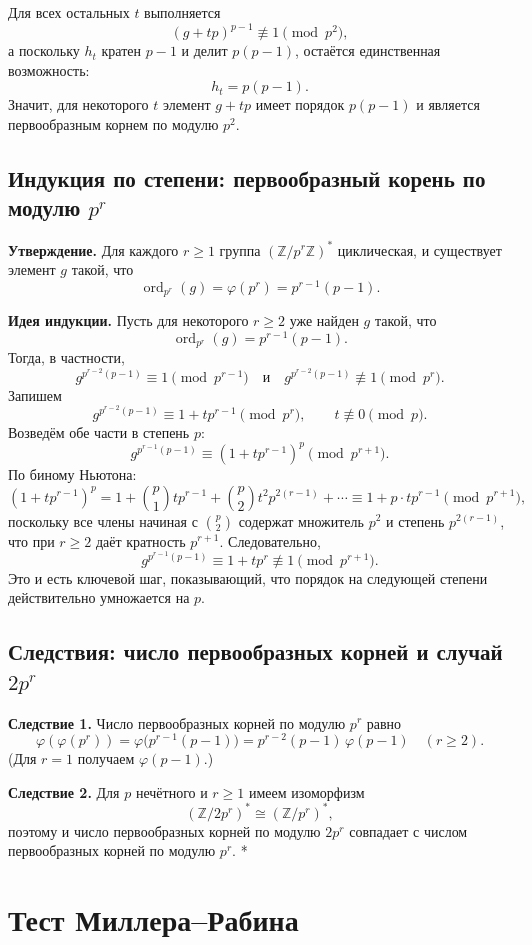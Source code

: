 \documentclass[12pt,a4paper]{article}
\newcommand{\Z}{\mathbb{Z}}
\DeclareMathOperator{\ord}{ord}
\begin{document}
Для всех остальных $t$ выполняется
\[
(g+t p)^{p-1}\not\equiv 1\pmod{p^2},
\]
а поскольку $h_t$ кратен $p-1$ и делит $p(p-1)$, остаётся единственная возможность:
\[
h_t=p(p-1).
\]
Значит, для некоторого $t$ элемент $g+t p$ имеет порядок $p(p-1)$ и является первообразным корнем по модулю $p^2$.

\subsection*{Индукция по степени: первообразный корень по модулю $p^r$}

\textbf{Утверждение.} Для каждого $r\ge 1$ группа $(\Z/p^r\Z)^{\ast}$ циклическая, и существует элемент $g$ такой, что
\[
\ord_{p^r}(g)=\varphi(p^r)=p^{r-1}(p-1).
\]

\textbf{Идея индукции.}
Пусть для некоторого $r\ge 2$ уже найден $g$ такой, что
\[
\ord_{p^r}(g)=p^{r-1}(p-1).
\]
Тогда, в частности,
\[
g^{p^{r-2}(p-1)}\equiv 1\pmod{p^{r-1}}
\quad\text{и}\quad
g^{p^{r-2}(p-1)}\not\equiv 1\pmod{p^{r}}.
\]
Запишем
\[
g^{p^{r-2}(p-1)} \equiv 1+t p^{r-1}\pmod{p^{r}},
\qquad t\not\equiv 0\pmod p.
\]
Возведём обе части в степень $p$:
\[
g^{p^{r-1}(p-1)} \equiv (1+t p^{r-1})^{p}\pmod{p^{r+1}}.
\]
По биному Ньютона:
\[
(1+t p^{r-1})^{p}
=1+\binom{p}{1}t p^{r-1}+\binom{p}{2}t^2 p^{2(r-1)}+\cdots
\equiv 1+p\cdot t p^{r-1}\pmod{p^{r+1}},
\]
поскольку все члены начиная с $\binom{p}{2}$ содержат множитель $p^2$ и степень $p^{2(r-1)}$, что при $r\ge 2$ даёт кратность $p^{r+1}$.
Следовательно,
\[
g^{p^{r-1}(p-1)} \equiv 1+t p^{r}\not\equiv 1\pmod{p^{r+1}}.
\]
Это и есть ключевой шаг, показывающий, что порядок на следующей степени действительно умножается на $p$.

\subsection*{Следствия: число первообразных корней и случай $2p^r$}

\textbf{Следствие 1.} Число первообразных корней по модулю $p^r$ равно
\[
\varphi(\varphi(p^r))=\varphi\bigl(p^{r-1}(p-1)\bigr)=p^{r-2}(p-1)\,\varphi(p-1)\quad (r\ge 2).
\]
(Для $r=1$ получаем $\varphi(p-1)$.)

\textbf{Следствие 2.} Для $p$ нечётного и $r\ge 1$ имеем изоморфизм
\[
(\Z/2p^r)^{\ast}\cong(\Z/p^r)^{\ast},
\]
поэтому и число первообразных корней по модулю $2p^r$ совпадает с числом первообразных корней по модулю $p^r$.
*
\section{Тест Миллера--Рабина}
\end{document}
